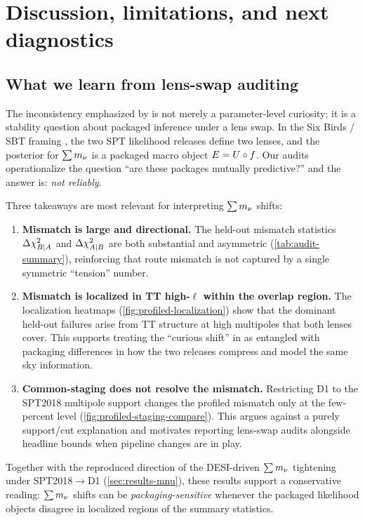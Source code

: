 \section{Discussion, limitations, and next diagnostics}
\label{sec:discussion}

\subsection{What we learn from lens-swap auditing}
The inconsistency emphasized by \cite{arxiv2601_16277} is not merely a parameter-level curiosity; it is a stability question about packaged inference under a lens swap. In the Six Birds / SBT framing \cite{sixbirds_foundations,sixbirds_darkenergy}, the two SPT likelihood releases define two lenses, and the posterior for $\sum m_\nu$ is a packaged macro object $E=U\circ f$. Our audits operationalize the question ``are these packages mutually predictive?'' and the answer is: \emph{not reliably}.

Three takeaways are most relevant for interpreting $\sum m_\nu$ shifts:
\begin{enumerate}[leftmargin=*, itemsep=2pt]
  \item \textbf{Mismatch is large and directional.} The held-out mismatch statistics $\Delta \chi^2_{B|A}$ and $\Delta \chi^2_{A|B}$ are both substantial and asymmetric (\cref{tab:audit-summary}), reinforcing that route mismatch is not captured by a single symmetric ``tension'' number.
  \item \textbf{Mismatch is localized in TT high-$\ell$ within the overlap region.} The localization heatmaps (\cref{fig:profiled-localization}) show that the dominant held-out failures arise from TT structure at high multipoles that both lenses cover. This supports treating the ``curious shift'' in \cite{arxiv2601_16277} as entangled with packaging differences in how the two releases compress and model the same sky information.
  \item \textbf{Common-staging does not resolve the mismatch.} Restricting D1 to the SPT2018 multipole support changes the profiled mismatch only at the few-percent level (\cref{fig:profiled-staging-compare}). This argues against a purely support/cut explanation and motivates reporting lens-swap audits alongside headline bounds when pipeline changes are in play.
\end{enumerate}

Together with the reproduced direction of the DESI-driven $\sum m_\nu$ tightening under SPT2018$\rightarrow$D1 (\cref{sec:results-mnu}), these results support a conservative reading: $\sum m_\nu$ shifts can be \emph{packaging-sensitive} whenever the packaged likelihood objects disagree in localized regions of the summary statistics.

